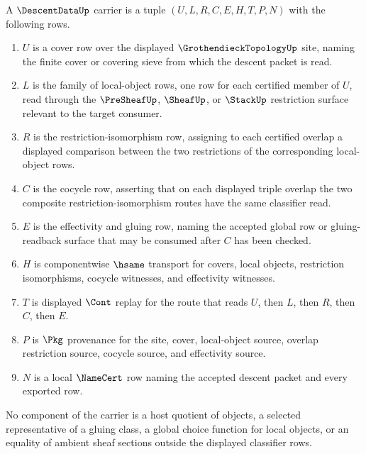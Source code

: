 \begin{definition}\label{def:descent-data-carrier}
A $\DescentDataUp$ carrier is a tuple $(U,L,R,C,E,H,T,P,N)$ with the following rows.
\begin{enumerate}
\item $U$ is a cover row over the displayed $\GrothendieckTopologyUp$ site, naming the finite cover or covering sieve from which the descent packet is read.
\item $L$ is the family of local-object rows, one row for each certified member of $U$, read through the $\PreSheafUp$, $\SheafUp$, or $\StackUp$ restriction surface relevant to the target consumer.
\item $R$ is the restriction-isomorphism row, assigning to each certified overlap a displayed comparison between the two restrictions of the corresponding local-object rows.
\item $C$ is the cocycle row, asserting that on each displayed triple overlap the two composite restriction-isomorphism routes have the same classifier read.
\item $E$ is the effectivity and gluing row, naming the accepted global row or gluing-readback surface that may be consumed after $C$ has been checked.
\item $H$ is componentwise $\hsame$ transport for covers, local objects, restriction isomorphisms, cocycle witnesses, and effectivity witnesses.
\item $T$ is displayed $\Cont$ replay for the route that reads $U$, then $L$, then $R$, then $C$, then $E$.
\item $P$ is $\Pkg$ provenance for the site, cover, local-object source, overlap restriction source, cocycle source, and effectivity source.
\item $N$ is a local $\NameCert$ row naming the accepted descent packet and every exported row.
\end{enumerate}
No component of the carrier is a host quotient of objects, a selected representative of a gluing class, a global choice function for local objects, or an equality of ambient sheaf sections outside the displayed classifier rows.
\end{definition}

